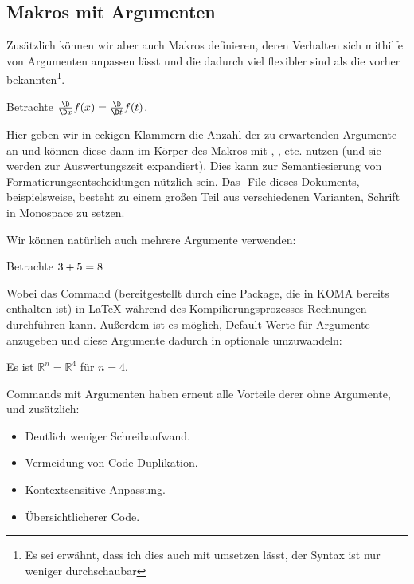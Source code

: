 \subsection{Makros mit Argumenten}
Zusätzlich können wir aber auch Makros definieren, deren Verhalten sich mithilfe von Argumenten anpassen lässt und die dadurch viel flexibler sind als die vorher bekannten\footnote{Es sei erwähnt, dass ich dies auch mit  umsetzen lässt, der Syntax ist nur weniger durchschaubar}.
\begin{latexlisting}
	\newcommand{\differential}[1]{\frac{\D}{\D #1}}

	Betrachte $\differential{x} f(x) = \differential{t} f(t)$.
\end{latexlisting}
Hier geben wir in eckigen Klammern die Anzahl der zu erwartenden Argumente an und können diese dann im Körper des Makros mit , , etc. nutzen (und sie werden zur Auswertungszeit expandiert).
Dies kann zur Semantiesierung von Formatierungsentscheidungen nützlich sein.
Das -File dieses Dokuments, beispielsweise, besteht zu einem großen Teil aus verschiedenen Varianten, Schrift in Monospace zu setzen.
\begin{latexlisting}
	\newcommand{\latexcommand}[1]{\texttt{\textbackslash #1}}
	\newcommand{\latexpackage}[1]{\texttt{#1}}
	\newcommand{\latexargument}[1]{\texttt{#1}}
	\newcommand{\latexenvironment}[1]{\texttt{#1}}
	\newcommand{\filetype}[1]{.\texttt{#1}}
	\newcommand{\filepath}[1]{\texttt{#1}}
	\newcommand{\key}[1]{\texttt{#1}}
\end{latexlisting}
Wir können natürlich auch mehrere Argumente verwenden:
\begin{latexlisting}
	\newcommand{\add}[2]{#1 + #2 = \fpeval{#1 + #2}}

	Betrachte $\add{3}{5}$
\end{latexlisting}
Wobei das Command  (bereitgestellt durch eine Package, die in KOMA bereits enthalten ist) in \LaTeX{} während des Kompilierungsprozesses Rechnungen durchführen kann.
Außerdem ist es möglich, Default-Werte für Argumente anzugeben und diese Argumente dadurch in optionale umzuwandeln:
\begin{latexlisting}
	\newcommand{\reals}[1][n]{\mathbb{R}^{#1}}

	Es ist $\reals = \reals[4]$ für $n = 4$.
\end{latexlisting}
Commands mit Argumenten haben erneut alle Vorteile derer ohne Argumente, und zusätzlich:
\begin{itemize}
	\item Deutlich weniger Schreibaufwand.
	\item Vermeidung von Code-Duplikation.
	\item Kontextsensitive Anpassung.
	\item Übersichtlicherer Code.
\end{itemize}
